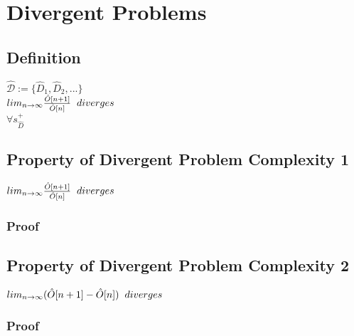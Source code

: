 \documentclass[11pt]{article}
\begin{document}
\section{Divergent Problems}
\subsection{Definition}
\begin{center}
$
\mathcal{\hat{D}} := \{ \hat{D}_1,\hat{D}_2,...\} 
$
\\ \vspace{2mm}
$
lim_{n \rightarrow \infty} \frac{\hat{O}[n+1]}{\hat{O}[n]} \hspace{2mm} diverges
$
\\ \vspace{2mm}
$
\forall s^+_{\hat{D}}
$
\end{center}

\subsection{Property of Divergent Problem Complexity 1}
\begin{center}
$
lim_{n \rightarrow \infty} \frac{\hat{O}[n+1]}{\hat{O}[n]} \hspace{2mm} diverges
$
\end{center}
\subsubsection{Proof}


\subsection{Property of Divergent Problem Complexity 2}
\begin{center}
$
lim_{n \rightarrow \infty}( \hat{O}[n+1] - \hat{O}[n] ) \hspace{2mm} diverges
$
\end{center}
\subsubsection{Proof}
\end{document}

